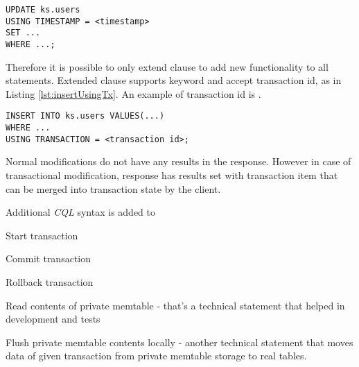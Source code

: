 
\begin{lstlisting}[style=outcode,label={lst:updateUsing},caption={Update statement with using clause}]
UPDATE ks.users 
USING TIMESTAMP = <timestamp> 
SET ...
WHERE ...;
\end{lstlisting}


Therefore it is possible to only extend  clause to add new functionality to all statements. Extended  clause supports  keyword and accept transaction id, as in Listing \ref{lst:insertUsingTx}. An example of transaction id is .


\begin{lstlisting}[style=outcode,label={lst:insertUsingTx},caption={Insert statement with using transactional clause}]
INSERT INTO ks.users VALUES(...) 
WHERE ...
USING TRANSACTION = <transaction id>;
\end{lstlisting}


Normal modifications do not have any results in the response. However in case of transactional modification, response has results set with transaction item that can be merged into transaction state by the client.

Additional \emph{CQL} syntax is added to
\begin{enumerate*}
\item Start transaction
\item Commit transaction
\item Rollback transaction
\item Read contents of private memtable - that’s a technical statement that helped in development and tests
\item Flush private memtable contents locally - another technical statement that moves data of given transaction from private memtable storage to real tables.
\end{enumerate*}


